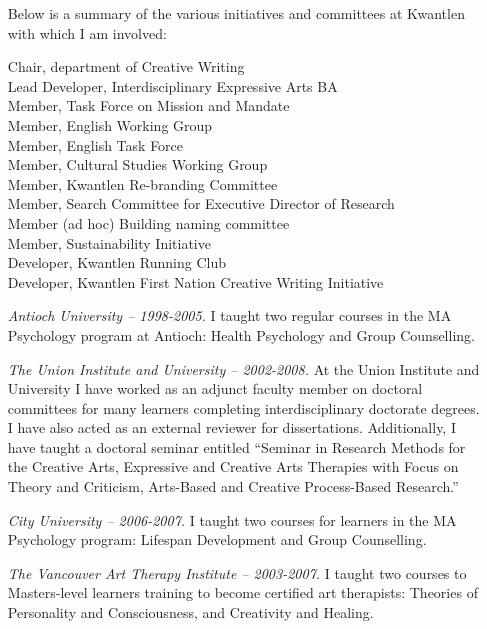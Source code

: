 \documentclass[10pt,DIV09,letterpaper,oneside,headsepline]{scrreprt}
\begin{document}
\begin{itemize}
Below is a summary of the various initiatives and committees at Kwantlen with which I am involved:

Chair, department of Creative Writing\\
Lead Developer, Interdisciplinary Expressive Arts BA\\
Member, Task Force on Mission and Mandate\\
Member, English Working Group\\
Member, English Task Force\\
Member, Cultural Studies Working Group\\
Member, Kwantlen Re-branding Committee\\
Member, Search Committee for Executive Director of Research\\
Member (ad hoc) Building naming committee\\
Member, Sustainability Initiative\\
Developer, Kwantlen Running Club\\
Developer, Kwantlen First Nation Creative Writing Initiative

\item [\textit{Antioch University -- 1998-2005.}]
I taught two regular courses in the MA Psychology program at Antioch: Health Psychology and Group Counselling.

\item [\textit{The Union Institute and University -- 2002-2008.}] At the Union Institute and University I have worked as an adjunct faculty member on doctoral committees for many learners completing interdisciplinary doctorate degrees. I have also acted as an external reviewer for dissertations. Additionally, I have taught a doctoral seminar entitled ``Seminar in Research Methods for the Creative Arts, Expressive and Creative Arts Therapies with Focus on Theory and Criticism, Arts-Based and Creative Process-Based Research.''

\item [\textit{City University -- 2006-2007.}] I taught two courses for learners in the MA Psychology program: Lifespan Development and Group Counselling.

\item [\textit{The Vancouver Art Therapy Institute -- 2003-2007.}] I taught two courses to Masters-level learners training to become certified art therapists: Theories of Personality and Consciousness, and Creativity and Healing.


\end{itemize}
\end{document}
